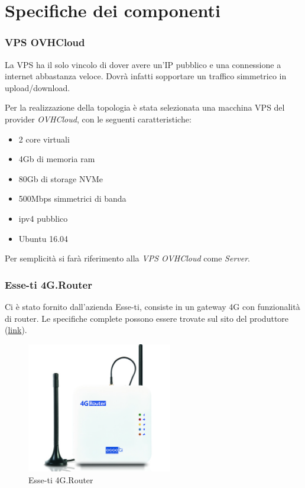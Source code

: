 \section{Specifiche dei componenti}

\subsubsection{VPS OVHCloud}
\label{subsec:vps-ovhcloud}

La VPS ha il solo vincolo di dover avere un'IP pubblico e una connessione a internet abbastanza veloce. Dovrà infatti sopportare un traffico simmetrico in upload/download.

Per la realizzazione della topologia è stata selezionata una macchina VPS del provider \textit{OVHCloud}, con le seguenti caratteristiche:


\begin{itemize}[nosep]
	\item 2 core virtuali
	\item 4Gb di memoria ram
	\item 80Gb di storage NVMe
	\item 500Mbps simmetrici di banda
	\item ipv4 pubblico
	\item Ubuntu 16.04
\end{itemize}

Per semplicità si farà riferimento alla \textit{VPS OVHCloud} come \textit{Server}.

\subsubsection{Esse-ti 4G.Router}

Ci è stato fornito dall'azienda Esse-ti, consiste in un gateway 4G con funzionalità di router. Le specifiche complete possono essere trovate sul sito del produttore (\href{https://www.esse-ti.it/4g-router}{link}).


\begin{figure}[ht]
	\centering
	\includegraphics[width=240px]{immagini/4grouter.jpg}
	\caption{Esse-ti 4G.Router}
	\label{fig:esse-ti-router-4g}
\end{figure}

